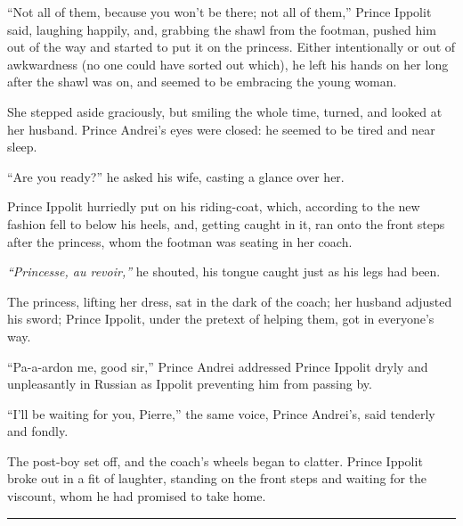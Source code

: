 ``Not all of them, because you won't be there; not all of them,'' Prince Ippolit said, laughing happily, and, grabbing the shawl from the footman, pushed him out of the way and started to put it on the princess. Either intentionally or out of awkwardness (no one could have sorted out which), he left his hands on her long after the shawl was on, and seemed to be embracing the young woman. 

She stepped aside graciously, but smiling the whole time, turned, and looked at her husband. Prince Andrei's eyes were closed: he seemed to be tired and near sleep.

``Are you ready?'' he asked his wife, casting a glance over her. %

Prince Ippolit hurriedly put on his riding-coat, which, according to the new fashion fell to below his heels, and, getting caught in it, ran onto the front steps after the princess, whom the footman was seating in her coach.

\textit{``Princesse, au revoir,''} he shouted, his tongue caught just as his legs had been.

The princess, lifting her dress, sat in the dark of the coach; her husband adjusted his sword; Prince Ippolit, under the pretext of helping them, got in everyone's way.

``Pa-a-ardon me, good sir,'' Prince Andrei addressed Prince Ippolit dryly and unpleasantly in Russian as Ippolit preventing him from passing by. %

``I'll be waiting for you, Pierre,'' the same voice, Prince Andrei's, said tenderly and fondly. %

The post-boy set off, and the coach's wheels began to clatter. Prince Ippolit broke out in a fit of laughter, standing on the front steps and waiting for the viscount, whom he had promised to take home.

\begin{center}
	\rule{5em}{0.4pt}
\end{center}
